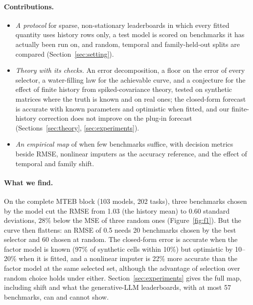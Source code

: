 \paragraph{Contributions.}
\begin{itemize}
\item \emph{A protocol} for sparse, non-stationary leaderboards in which every fitted quantity uses history rows only, a test model is scored on benchmarks it has actually been run on, and random, temporal and family-held-out splits are compared (Section~\ref{sec:setting}).
\item \emph{Theory with its checks.} An error decomposition, a floor on the error of every selector, a water-filling law for the achievable curve, and a conjecture for the effect of finite history from spiked-covariance theory, tested on synthetic matrices where the truth is known and on real ones; the closed-form forecast is accurate with known parameters and optimistic when fitted, and our finite-history correction does not improve on the plug-in forecast (Sections~\ref{sec:theory}, \ref{sec:experiments}).
\item \emph{An empirical map} of when few benchmarks suffice, with decision metrics beside RMSE, nonlinear imputers as the accuracy reference, and the effect of temporal and family shift.
\end{itemize}

\paragraph{What we find.}
On the complete MTEB block (103 models, 202 tasks), three benchmarks chosen by the model cut the RMSE from 1.03 (the history mean) to 0.60 standard deviations, $28\%$ below the MSE of three random ones (Figure~\ref{fig:f1}).
But the curve then flattens: an RMSE of 0.5 needs 20 benchmarks chosen by the best selector and 60 chosen at random.
The closed-form error is accurate when the factor model is known (97\% of synthetic cells within 10\%) but optimistic by 10--20\% when it is fitted, and a nonlinear imputer is 22\% more accurate than the factor model at the same selected set, although the advantage of selection over random choice holds under either.
Section~\ref{sec:experiments} gives the full map, including shift and what the generative-LLM leaderboards, with at most 57 benchmarks, can and cannot show.
